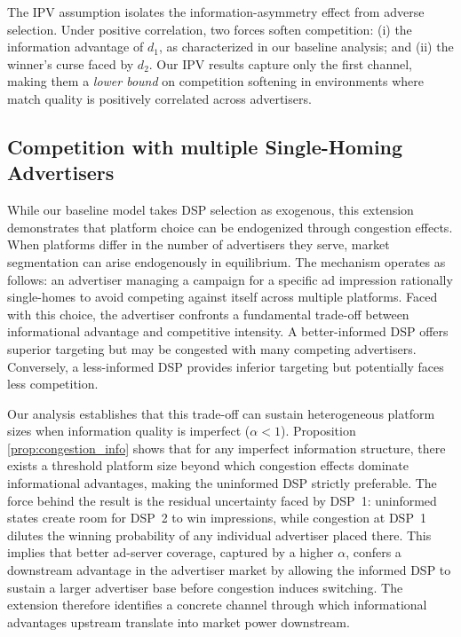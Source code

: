 \begin{rem}
The IPV assumption isolates the information-asymmetry effect from adverse selection. Under positive correlation, two forces soften competition: (i) the information advantage of $d_1$, as characterized in our baseline analysis; and (ii) the winner's curse faced by $d_2$. Our IPV results capture only the first channel, making them a \emph{lower bound} on competition softening in environments where match quality is positively correlated across advertisers.
\end{rem}

\subsection{Competition with multiple Single-Homing Advertisers}\label{multiple-ADV}
\noindent While our baseline model takes DSP selection as exogenous, this extension demonstrates that platform choice can be endogenized through congestion effects. When platforms differ in the number of advertisers they serve, market segmentation can arise endogenously in equilibrium. The mechanism operates as follows: an advertiser managing a campaign for a specific ad impression rationally single-homes to avoid competing against itself across multiple platforms. Faced with this choice, the advertiser confronts a fundamental trade-off between informational advantage and competitive intensity. A better-informed DSP offers superior targeting but may be congested with many competing advertisers. Conversely, a less-informed DSP provides inferior targeting but potentially faces less competition.

\noindent Our analysis establishes that this trade-off can sustain heterogeneous platform sizes when information quality is imperfect ($\alpha < 1$). Proposition \ref{prop:congestion_info} shows that for any imperfect information structure, there exists a threshold platform size beyond which congestion effects dominate informational advantages, making the uninformed DSP strictly preferable. The force behind the result is the residual uncertainty faced by DSP~1: uninformed states create room for DSP~2 to win impressions, while congestion at DSP~1 dilutes the winning probability of any individual advertiser placed there. This implies that better ad-server coverage, captured by a higher $\alpha$, confers a downstream advantage in the advertiser market by allowing the informed DSP to sustain a larger advertiser base before congestion induces switching. The extension therefore identifies a concrete channel through which informational advantages upstream translate into market power downstream.

